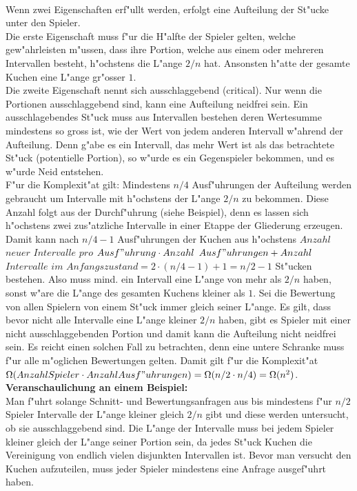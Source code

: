 \documentclass[11pt, a4paper, twoside]{article}
\numberwithin{equation}{section}
\begin{document}
\\Wenn zwei Eigenschaften erf"ullt werden, erfolgt eine Aufteilung der St"ucke unter den Spieler.\\Die erste Eigenschaft muss f"ur die H"alfte der Spieler gelten, welche gew"ahrleisten m"ussen, dass ihre Portion, welche aus einem oder mehreren Intervallen besteht, h"ochstens die L"ange $2/n$ hat. Ansonsten h"atte der gesamte Kuchen eine L"ange gr"osser $1$.\\Die zweite Eigenschaft nennt sich ausschlaggebend (critical). Nur wenn die Portionen ausschlaggebend sind, kann eine Aufteilung neidfrei sein. Ein ausschlagebendes St"uck muss aus Intervallen bestehen deren Wertesumme mindestens so gross ist, wie der Wert von jedem anderen Intervall w"ahrend der Aufteilung. Denn g"abe es ein Intervall, das mehr Wert ist als das betrachtete St"uck (potentielle Portion), so w"urde es ein Gegenspieler bekommen, und es w"urde Neid entstehen.\\F"ur die Komplexit"at gilt: Mindestens $n/4$ Ausf"uhrungen der Aufteilung werden gebraucht um Intervalle mit h"ochstens der L"ange $2/n$ zu bekommen. Diese Anzahl folgt aus der Durchf"uhrung (siehe Beispiel), denn es lassen sich h"ochstens zwei zus"atzliche Intervalle in einer Etappe der Gliederung erzeugen. Damit kann nach $n/4-1$ Ausf"uhrungen der Kuchen aus h"ochstens $Anzahl$ $neuer$ $Intervalle$ $pro$ $Ausf"uhrung \cdot Anzahl$ $Ausf"uhrungen + Anzahl$ $Intervalle$ $im$ $Anfangszustand= 2 \cdot (n/4-1)+1= n/2-1$ St"ucken bestehen. Also muss mind. ein Intervall eine L"ange von mehr als $2/n$ haben, sonst w"are die L"ange des gesamten Kuchens kleiner als $1$. Sei die Bewertung von allen Spielern von einem St"uck immer gleich seiner L"ange. Es gilt, dass bevor nicht alle Intervalle eine L"ange kleiner $2/n$ haben, gibt es Spieler mit einer nicht ausschlaggebenden Portion und damit kann die Aufteilung nicht neidfrei sein. Es reicht einen solchen Fall zu betrachten, denn eine untere Schranke muss f"ur alle m"oglichen Bewertungen gelten. Damit gilt f"ur die Komplexit"at $\Omega(Anzahl Spieler \cdot Anzahl Ausf"uhrungen)=\Omega(n/2 \cdot n/4)=\Omega(n^2)$.\\ \newline
\textbf{Veranschaulichung an einem Beispiel:}\\
Man f"uhrt solange Schnitt- und Bewertungsanfragen aus bis mindestens f"ur $n/2$ Spieler Intervalle der L"ange kleiner gleich $2/n$ gibt und diese werden untersucht, ob sie ausschlaggebend sind. Die L"ange der Intervalle muss bei jedem Spieler kleiner gleich der L"ange seiner Portion sein, da jedes St"uck Kuchen die Vereinigung von endlich vielen disjunkten Intervallen ist. Bevor man versucht den Kuchen aufzuteilen, muss jeder Spieler mindestens eine Anfrage ausgef"uhrt haben.\\
\end{document}

